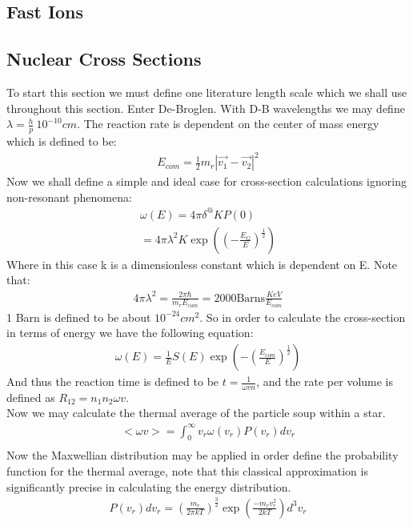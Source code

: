 \documentclass[11pt]{article}
\theoremstyle{quest}
\begin{document}
\subsection{Fast Ions}
\subsection{Nuclear Cross Sections}
To start this section we must define one literature length scale which we shall use throughout this section. Enter De-Broglen. With D-B wavelengths we may define $\lambda = \frac{h}{p} ~ 10^{-10} cm$. The reaction rate is dependent on the center of mass energy which is defined to be:
\begin{align}
E_{com} = \frac{1}{2} m_r |\vec{v_1} - \vec{v_2}|^2
\end{align}
Now we shall define a simple and ideal case for cross-section calculations ignoring non-resonant phenomena:
\begin{align}
\omega(E) = 4 \pi \delta^@ K P(0)\\
= 4 \pi \lambda^2 K \exp((-\frac{E_G}{E})^\frac{1}{2}) 
\end{align}
Where in this case k is a dimensionless constant which is dependent on E. Note that:
\begin{align}
4 \pi \lambda^2 = \frac{2 \pi \hbar}{m_r E_{com}} = 2000 \text{Barns}\frac{KeV}{E_{com}}
\end{align}
1 Barn is defined to be about $10^{-24} cm^2$. So in order to calculate the cross-section in terms of energy we have the following equation:
\begin{align}
\omega(E) = \frac{1}{E} S(E) \exp(-(\frac{E_{com}}{E})^\frac{1}{2})
\end{align}
And thus the reaction time is defined to be $t = \frac{1}{\omega v n}$, and the rate per volume is defined as $R_{12} = n_1 n_2 \omega v$.\\
Now we may calculate the thermal average of the particle soup within a star.
\begin{align*}
<\omega v> = \int_0^{\infty} v_r \omega(v_{r}) P(v_r) dv_r\\
\end{align*}
Now the Maxwellian distribution may be applied in order define the probability function for the thermal average, note that this classical approximation is significantly precise in calculating the energy distribution.
\begin{align*}
P(v_r)dv_r = (\frac{m_r}{2\pi kT})^{\frac{3}{2}} \exp(\frac{-m_r v_r^2}{2 kT})d^3v_r
\end{align*}
\end{document}
